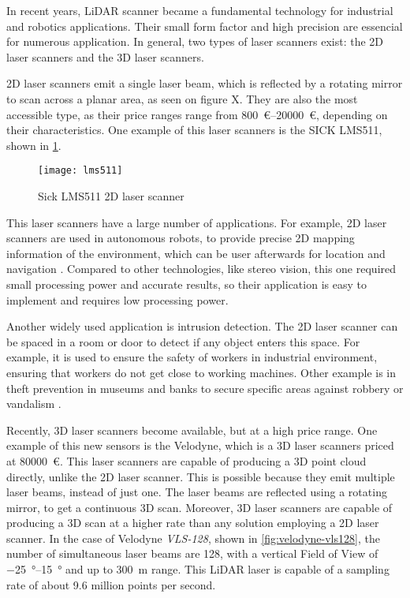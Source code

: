 In recent years, LiDAR scanner became a fundamental technology for industrial and robotics applications. Their small form factor and high precision are essencial for numerous application. In general, two types of laser scanners exist: the 2D laser scanners and the 3D laser scanners. 

2D laser scanners emit a single laser beam, which is reflected by a rotating mirror to scan across a planar area, as seen on figure X. They are also the most accessible type, as their price ranges range from \SIrange{800}{20000}{\euro}, depending on their characteristics. One example of this laser scanners is the SICK LMS511, shown in \cref{fig:sick-lms511}. 

\begin{figure}
    \centering
    \texttt{[image: lms511]}
    \caption{Sick LMS511 2D laser scanner}
    \label{fig:sick-lms511}
\end{figure}

This laser scanners have a large number of applications. For example, 2D laser scanners are used in autonomous robots, to provide precise 2D mapping information of the environment, which can be user afterwards for location and navigation \cite{siritanawan17}. Compared to other technologies, like stereo vision, this one required small processing power and accurate results, so their application is easy to implement and requires low processing power. 

Another widely used application is intrusion detection. The 2D laser scanner can be spaced in a room or door to detect if any object enters this space. For example, it is used to ensure the safety of workers in industrial environment, ensuring that workers do not get close to working machines. Other example is in theft prevention in museums and banks to secure specific areas against robbery or vandalism \cite{sick-security}.

Recently, 3D laser scanners become available, but at a high price range. One example of this new sensors is the Velodyne, which is a 3D laser scanners priced at \SI{80000}{\euro}. This laser scanners are capable of producing a 3D point cloud directly, unlike the 2D laser scanner. This is possible because they emit multiple laser beams, instead of just one. The laser beams are reflected using a rotating mirror, to get a continuous 3D scan. Moreover, 3D laser scanners are capable of producing a 3D scan at a higher rate than any solution employing a 2D laser scanner. In the case of Velodyne \emph{VLS-128}, shown in \cref{fig:velodyne-vls128}, the number of simultaneous laser beams are \num{128}, with a vertical Field of View of \SIrange{-25}{+15}{\degree} and up to \SI{300}{\meter} range\cite{velodyne-vls128}. This LiDAR laser is capable of a sampling rate of about 9.6 million points per second.

